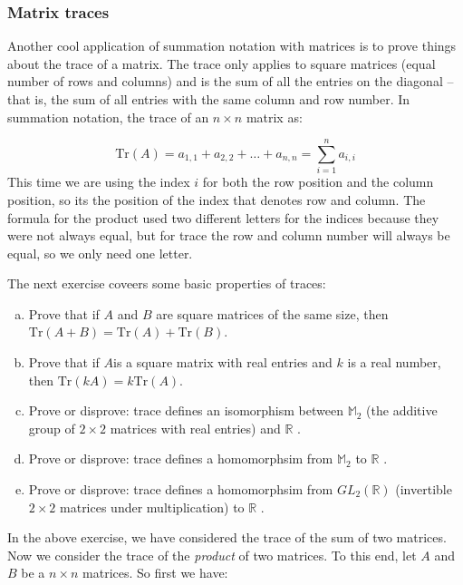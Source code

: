 \subsubsection*{Matrix traces}
Another cool application of summation notation with matrices is to prove things about the {\bfi trace} of a matrix.  The trace only applies to square matrices (equal number of rows and columns) and is the sum of all the entries on the diagonal -- that is,  the sum of all entries with the same column and row number.  In summation notation, the trace of an $n \times n$ matrix as:

\[ \text{Tr} \left( A \right)= a_{1,1} + a_{2,2} + \ldots + a_{n,n} = \sum_{i=1}^n a_{i,i} \] 
This time we are using the index $i$ for both the row position and the column position, so its the position of the index that denotes row and column.  The formula for the product used two different letters for the indices because they were not always equal, but for trace the row and column number will always be equal, so we only need one letter.

The next exercise coveers some basic properties of traces:

\begin{exercise}{}
\begin{enumerate}[(a)]
\item
Prove that if $A$ and $B$ are square matrices of the same size, then $\text{Tr} \left( A + B \right) = \text{Tr} \left( A \right) + \text{Tr} \left( B \right)$.
\item
Prove that if $A $is a square matrix with real entries and $k$ is a real number, then $\text{Tr} \left(k A  \right) = k\text{Tr} \left( A \right)$.
\item
Prove or disprove: trace defines an isomorphism between $\mathbb{M}_2$ (the additive group of $2 \times 2$ matrices with real entries) and $\mathbb{R}$ .
\item
Prove or disprove: trace defines a homomorphsim from $\mathbb{M}_2$ to $\mathbb{R}$ .
\item
Prove or disprove: trace defines a homomorphsim from $GL_2(\mathbb{R})$ (invertible $2 \times 2$ matrices under multiplication)  to $\mathbb{R}$ .
\end{enumerate}
\end{exercise}


In the above exercise, we have considered the trace of the sum of two matrices. Now we consider the trace of the \emph{product} of two matrices.  To this end, let ${A}$ and  ${B}$ be a $n \times n$ matrices.  So first we have:

